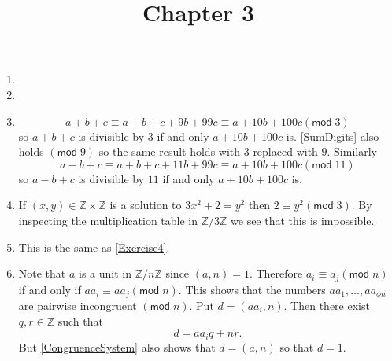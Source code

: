 \documentclass[12pt]{article}
\title{Chapter 3}
\author{}\date{}
\renewcommand{\pmod}[1]{\left(\mathsf{mod}\;#1\right)}
\begin{document}
\maketitle
\thispagestyle{empty}

\begin{enumerate}
\item %
\item %
\item %
\begin{equation}\label{SumDigits}
a+b+c\equiv a+b+c+9b+99c\equiv a+10b+100c\pmod{3}
\end{equation}
so $a+b+c$ is divisible by $3$ if and only $a+10b+100c$
is. \autoref{SumDigits} also holds $\pmod{9}$ so the
same result holds with $3$ replaced with $9$. Similarly
\[a-b+c\equiv a+b+c+11b+99c\equiv a+10b+100c\pmod{11}\]
so $a-b+c$ is divisible by $11$ if and only $a+10b+100c$ is.

\item\label{Exercise4} %
If $\left(x,y\right)\in\mathbb{Z}\times\mathbb{Z}$
is a solution to $3x^2+2=y^2$ then $2\equiv y^2\pmod{3}$.
By inspecting the multiplication table
in $\mathbb{Z}/3\mathbb{Z}$ we see
that this is impossible.

\item %
This is the same as \autoref{Exercise4}.

\item %
Note that $a$ is a unit in $\mathbb{Z}/n\mathbb{Z}$
since $\left(a,n\right)=1$. Therefore
$a_i\equiv a_j\pmod{n}$ if and only if $aa_i\equiv aa_j
\pmod{n}$. This shows that
the numbers $aa_1,\ldots,aa_{\phi{n}}$
are pairwise incongruent $\pmod{n}$. Put
$d=\left(aa_i,n\right)$. Then there exist $q,r\in\mathbb{Z}$
such that
\begin{equation}\label{CongruenceSystem}
d=aa_iq+nr.\end{equation}
But \autoref{CongruenceSystem} also shows that
$d=\left(a,n\right)$ so that $d=1$.

\end{enumerate}
\end{document}
